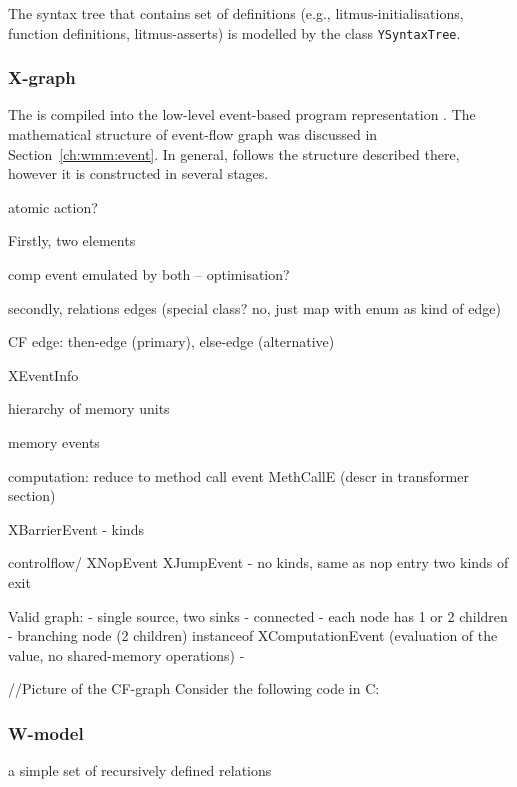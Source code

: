 The syntax tree that contains set of definitions (e.g., litmus-initialisations, function definitions, litmus-asserts) is modelled by the class \texttt{YSyntaxTree}.


\subsubsection{X-graph}
\label{ch:impl:model:xgraph}

The \ytree{} is compiled into the low-level event-based program representation \xgraph{}.
The mathematical structure of event-flow graph was discussed in Section~\ref{ch:wmm:event}.
In general, \xgraph{} follows the structure described there, however it is constructed in several stages.


atomic action?

Firstly, two elements

comp event emulated by both -- optimisation?

secondly, relations edges (special class? no, just map with enum as kind of edge)


CF edge: then-edge (primary), else-edge (alternative)


XEventInfo


hierarchy of memory units


memory events

computation: reduce to method call event
MethCallE (descr in transformer section)

XBarrierEvent - kinds

controlflow/ %
XNopEvent
XJumpEvent - no kinds, same as nop
entry
two kinds of exit


Valid graph:
- single source, two sinks
- connected
- each node has 1 or 2 children
- branching node (2 children) instanceof XComputationEvent (evaluation of the value, no shared-memory operations)
- 


//Picture of the CF-graph
Consider the following code in C:


\subsubsection{W-model}
\label{ch:impl:model:wmodel}

a simple set of recursively defined relations

